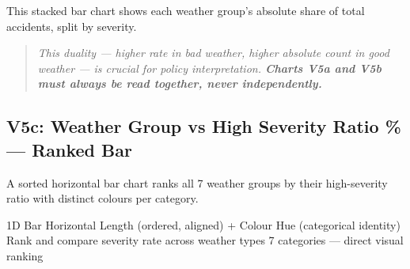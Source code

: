 This stacked bar chart shows each weather group's absolute share of total
accidents, split by severity.

\begin{figure}[H]
  \centering
  \label{fig:v5b}
\end{figure}


\begin{quote}
  \itshape
  This duality --- higher rate in bad weather, higher absolute count in good
  weather --- is crucial for policy interpretation.
  \textbf{Charts V5a and V5b must always be read together, never independently.}
\end{quote}

\subsection{V5c: Weather Group vs High Severity Ratio \% --- Ranked Bar}

A sorted horizontal bar chart ranks all 7 weather groups by their high-severity
ratio with distinct colours per category.

\begin{figure}[H]
  \centering
  \label{fig:v5c}
\end{figure}

\idiomtable
  {1D Bar}
  {Horizontal Length (ordered, aligned) + Colour Hue (categorical identity)}
  {Rank and compare severity rate across weather types}
  {7 categories --- direct visual ranking}

